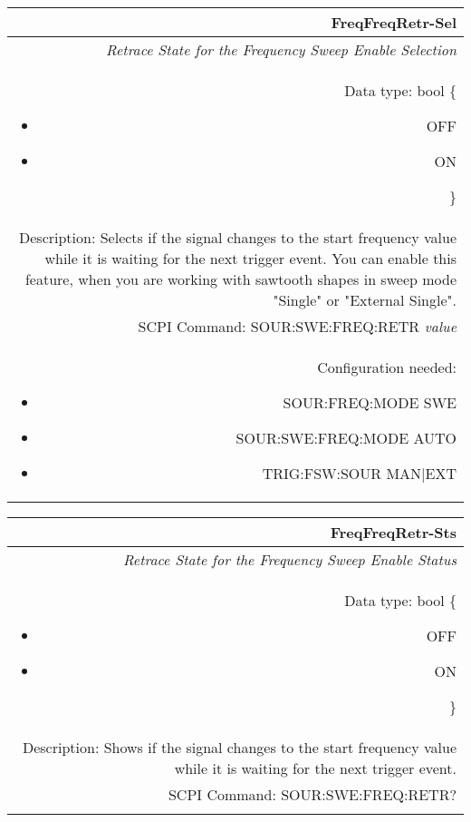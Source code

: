 \documentclass[openany]{article}
\begin{document}
		\begin{tabular}{N}
			\hline
			\bfseries FreqFreqRetr-Sel \\ \hline
			\emph{Retrace State for the Frequency Sweep Enable Selection} \\
			Data type: bool \{\begin{itemize}[noitemsep]
				\small
				\item[] OFF
				\item[] ON
			\end{itemize}\} \\
			Description: Selects if the signal changes to the start frequency value while it is waiting for the next trigger event. You can enable this feature, when you are working with sawtooth shapes in sweep mode "Single" or "External Single". \\
			SCPI Command: SOUR:SWE:FREQ:RETR \emph{value} \\
			Configuration needed: \begin{itemize}[noitemsep]
				\small
				\item[] SOUR:FREQ:MODE SWE
				\item[] SOUR:SWE:FREQ:MODE AUTO
				\item[] TRIG:FSW:SOUR MAN|EXT
			\end{itemize} \\

		\end{tabular}


		\begin{tabular}{N}
			\hline
			\bfseries FreqFreqRetr-Sts \\ \hline
			\emph{Retrace State for the Frequency Sweep Enable Status} \\
			Data type: bool \{\begin{itemize}[noitemsep]
				\small
				\item[] OFF
				\item[] ON
			\end{itemize}\} \\
			Description: Shows if the signal changes to the start frequency value while it is waiting for the next trigger event. \\
			SCPI Command: SOUR:SWE:FREQ:RETR? \\
			\\

		\end{tabular}
\end{document}
